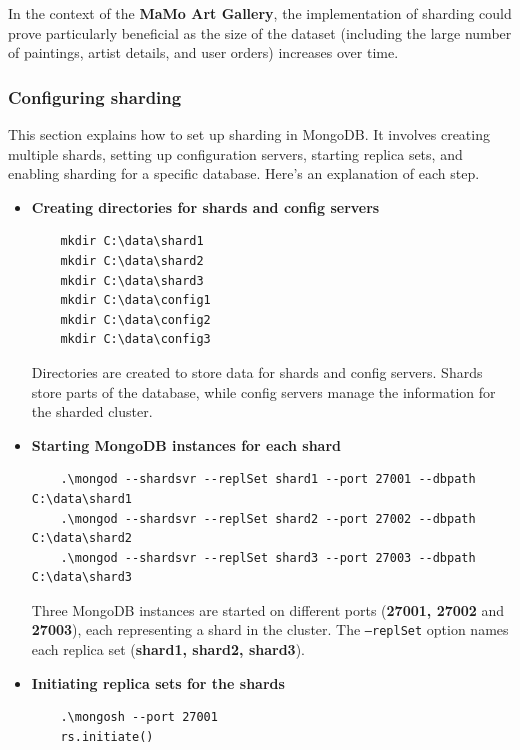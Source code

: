 \documentclass[a4paper,12pt]{article}
\begin{document}
In the context of the \textbf{MaMo Art Gallery}, the implementation of sharding could prove particularly beneficial as the size of the dataset (including the large number of paintings, artist details, and user orders) increases over time.

\subsubsection{Configuring sharding}
This section explains how to set up sharding in MongoDB. It involves creating multiple shards, setting up configuration servers, starting replica sets, and enabling sharding for a specific database. Here’s an explanation of each step.

\begin{itemize}
    \item \textbf{Creating directories for shards and config servers}

          \begin{lstlisting}
    mkdir C:\data\shard1
    mkdir C:\data\shard2
    mkdir C:\data\shard3
    mkdir C:\data\config1
    mkdir C:\data\config2
    mkdir C:\data\config3
    \end{lstlisting}

          Directories are created to store data for shards and config servers. Shards store parts of the database, while config servers manage the information for the sharded cluster.

    \item \textbf{Starting MongoDB instances for each shard}

          \begin{lstlisting}
    .\mongod --shardsvr --replSet shard1 --port 27001 --dbpath C:\data\shard1 
    .\mongod --shardsvr --replSet shard2 --port 27002 --dbpath C:\data\shard2 
    .\mongod --shardsvr --replSet shard3 --port 27003 --dbpath C:\data\shard3
    \end{lstlisting}

          Three MongoDB instances are started on different ports (\textbf{27001, 27002} and \textbf{27003}), each representing a shard in the cluster. The \texttt{--replSet} option names each replica set (\textbf{shard1, shard2, shard3}).


    \item \textbf{Initiating replica sets for the shards}

          \begin{lstlisting}
    .\mongosh --port 27001
    rs.initiate()


\end{lstlisting}
\end{itemize}
\end{document}
